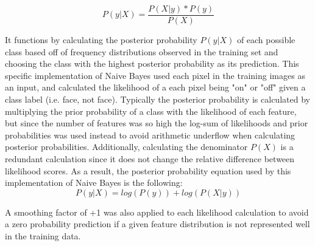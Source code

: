 \documentclass[11pt]{article}
\begin{document}
    \[P(y|X) = \frac{P(X|y)*P(y)}{P(X)}\]
    
    It functions by calculating the posterior probability $P(y|X)$ of each possible class based off of frequency distributions observed in the training set and choosing the class with the highest posterior probability as its prediction. This specific implementation of Naive Bayes used each pixel in the training images as an input, and calculated the likelihood of a each pixel being "on" or "off" given a class label (i.e. face, not face). Typically the posterior probability is calculated by multiplying the prior probability of a class  with the likelihood of each feature, but since the number of features was so high the log-sum of likelihoods and prior probabilities was used instead to avoid arithmetic underflow when calculating posterior probabilities. Additionally, calculating the denominator $P(X)$ is a redundant calculation since it does not change the relative difference between likelihood scores. As a result, the posterior probability equation used by this implementation of Naive Bayes is the following:\\ 
    \[P(y|X) = log(P(y)) + log(P(X|y))\]
    
    A smoothing factor of +1 was also applied to each likelihood calculation to avoid a zero probability prediction if a given feature distribution is not represented well in the training data.
    
\end{document}
